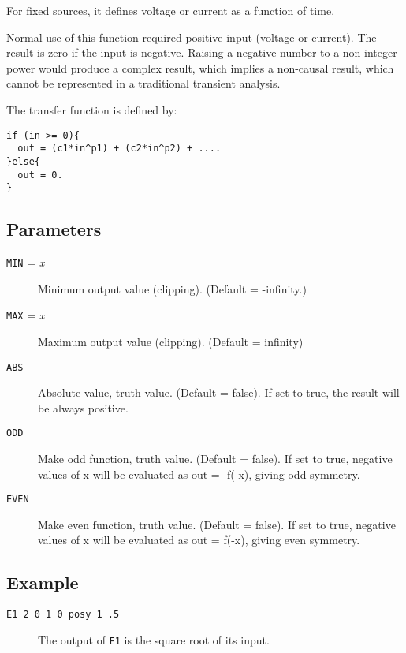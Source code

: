 For fixed sources, it defines voltage or current as a function of
time.

Normal use of this function required positive input (voltage or
current).  The result is zero if the input is negative.  Raising a
negative number to a non-integer power would produce a complex result, 
which implies a non-causal result, which cannot be represented in a
traditional transient analysis.

The transfer function is defined by:

\begin{verbatim}
if (in >= 0){
  out = (c1*in^p1) + (c2*in^p2) + ....
}else{
  out = 0.
}
\end{verbatim}
\subsection{Parameters}

\begin{description}
  
\item[{\tt MIN} = {\it x}] Minimum output value (clipping).  (Default
  = -infinity.)

\item[{\tt MAX} = {\it x}] Maximum output value (clipping).  (Default
  = infinity)

\item[{\tt ABS}] Absolute value, truth value.  (Default = false).  If
  set to true, the result will be always positive.

\item[{\tt ODD}] Make odd function, truth value.  (Default = false).
  If set to true, negative values of x will be evaluated as out =
  -f(-x), giving odd symmetry.
  
\item[{\tt EVEN}] Make even function, truth value.  (Default = false).
  If set to true, negative values of x will be evaluated as out =
  f(-x), giving even symmetry.


\end{description}
\subsection{Example} 

\begin{description}

\item[{\tt E1 2 0 1 0 posy 1 .5}] The output of {\tt E1} is the
square root of its input.

\end{description}
